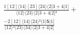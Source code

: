 \documentclass[varwidth, border=5pt]{standalone}
\begin{document}
\begin{my}
$\begin{gathered}
\scriptscriptstyle\frac{1[12]⟨14⟩[23]⟨24⟩⟨2|3+4|1]}{⟨12⟩⟨23⟩⟨2|3+4|2]²} +\\
\scriptscriptstyle\frac{-2[12]⟨14⟩⟨24⟩²⟨1|𝟓|1]}{⟨12⟩²⟨23⟩⟨34⟩⟨2|3+4|2]} \phantom{+}
\end{gathered}$
\end{my}
\end{document}
